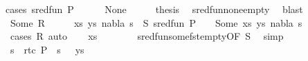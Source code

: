 \begin{isabellebody}
%
\endisadelimproof
%
\isatagproof
{}\isamarkupfalse%
{\isacharparenleft}{\kern0pt}cases\ {\isachardoublequoteopen}sred{\isacharunderscore}{\kern0pt}fun\ {\isacharparenleft}{\kern0pt}P{\isacharcomma}{\kern0pt}\ {\isacharbraceleft}{\kern0pt}{\isacharbraceright}{\kern0pt}{\isacharcomma}{\kern0pt}\ {\isacharbrackleft}{\kern0pt}{\isacharbrackright}{\kern0pt}{\isacharparenright}{\kern0pt}{\isachardoublequoteclose}{\isacharparenright}{\kern0pt}\isanewline
\ \ \isamarkupfalse%
\ None\isanewline
\ \ \isamarkupfalse%
\ \isamarkupfalse%
\ {\isacharquery}{\kern0pt}thesis\ \isamarkupfalse%
\ sred{\isacharunderscore}{\kern0pt}fun{\isacharunderscore}{\kern0pt}none{\isacharunderscore}{\kern0pt}empty\ \isamarkupfalse%
\ blast\isanewline
{}\isamarkupfalse%
\isanewline
\ \ \isamarkupfalse%
\ {\isacharparenleft}{\kern0pt}Some\ R{\isacharparenright}{\kern0pt}\isanewline
\ \ \isamarkupfalse%
\ \isamarkupfalse%
\ xs\ ys\ nabla{}\ s{}\ \ S{\isacharcolon}{\kern0pt}\ {\isachardoublequoteopen}sred{\isacharunderscore}{\kern0pt}fun\ {\isacharparenleft}{\kern0pt}P{\isacharcomma}{\kern0pt}\ {\isacharbraceleft}{\kern0pt}{\isacharbraceright}{\kern0pt}{\isacharcomma}{\kern0pt}\ {\isacharbrackleft}{\kern0pt}{\isacharbrackright}{\kern0pt}{\isacharparenright}{\kern0pt}\ {\isacharequal}{\kern0pt}\ Some\ {\isacharparenleft}{\kern0pt}{\isacharparenleft}{\kern0pt}xs{\isacharcomma}{\kern0pt}\ ys{\isacharparenright}{\kern0pt}{\isacharcomma}{\kern0pt}\ nabla{}{\isacharcomma}{\kern0pt}\ s{}{\isacharparenright}{\kern0pt}{\isachardoublequoteclose}\isanewline
\ \ \ \ \isamarkupfalse%
\ {\isacharparenleft}{\kern0pt}cases\ R{\isacharparenright}{\kern0pt}\ auto\isanewline
\ \ \isamarkupfalse%
\ {\isachardoublequoteopen}xs\ {\isacharequal}{\kern0pt}\ {\isacharbrackleft}{\kern0pt}{\isacharbrackright}{\kern0pt}{\isachardoublequoteclose}\isanewline
\ \ \ \ \isamarkupfalse%
\ sred{\isacharunderscore}{\kern0pt}fun{\isacharunderscore}{\kern0pt}some{\isacharunderscore}{\kern0pt}fst{\isacharunderscore}{\kern0pt}empty{\isacharbrackleft}{\kern0pt}OF\ S{\isacharbrackright}{\kern0pt}\ \isamarkupfalse%
\ simp\isanewline
\ \ \isamarkupfalse%
\ s{}\ \ rtc{\isacharcolon}{\kern0pt}\ {\isachardoublequoteopen}P\ {\isasymturnstile}\ s{}\ {\isasymleadsto}\isactrlsup {\isacharasterisk}{\kern0pt}\ {\isacharparenleft}{\kern0pt}{\isacharbrackleft}{\kern0pt}{\isacharbrackright}{\kern0pt}{\isacharcomma}{\kern0pt}\ ys{\isacharparenright}{\kern0pt}{\isachardoublequoteclose}\isanewline

\end{isabellebody}

